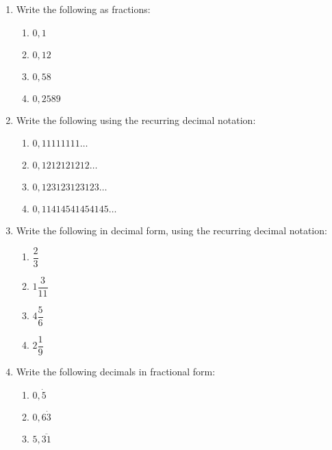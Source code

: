 \begin{exercises}{}
{\begin{enumerate}[itemsep=5pt, label=\textbf{\arabic*}. ]
    \begin{enumerate}[itemsep=0pt, label=\textbf{(\alph*)} ] 
    \item $1$
    \item $-10$
    \item $\sqrt{2}$
    \item $2,1$
    \end{enumerate}
\item Write the following as fractions:
    \begin{enumerate}[itemsep=0pt, label=\textbf{(\alph*)} ] 
    \item $0,1$
    \item $0,12$
    \item $0,58$
    \item $0,2589$
    \end{enumerate}
\item Write the following using the recurring decimal notation:
    \begin{enumerate}[itemsep=0pt, label=\textbf{(\alph*)} ] 
    \item $0,11111111\ldots$
    \item $0,1212121212\ldots$
    \item $0,123123123123\ldots$
    \item $0,11414541454145\ldots$
    \end{enumerate}
\item Write the following in decimal form, using the recurring decimal notation:
    \begin{enumerate}[itemsep=5pt, label=\textbf{(\alph*)} ] 
    \item $\dfrac{2}{3}$
    \item $1\dfrac{3}{11}$
    \item $4\dfrac{5}{6}$
    \item $2\dfrac{1}{9}$
    \end{enumerate}
\item Write the following decimals in fractional form:
    \begin{enumerate}[itemsep=2pt, label=\textbf{(\alph*)} ] 
    \item $0,\dot{5}$
    \item $0,6\dot{3}$
    \item $5,\overline{31}$
    \end{enumerate}
\end{enumerate}
}
\end{exercises}


